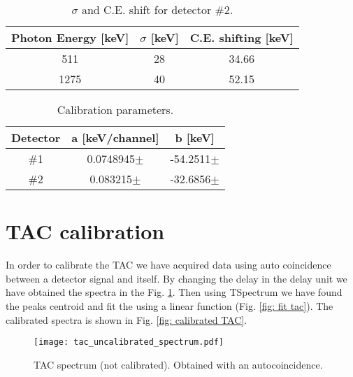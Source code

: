 \begin{table}[h!]
\centering
\begin{tabular}{ccc}
\toprule
\toprule
Photon Energy [keV] & $\sigma$ [keV] & C.E. shifting [keV] \\
\midrule
511 & 28 & 34.66 \\
1275 & 40 & 52.15\\
\bottomrule
\bottomrule
\end{tabular}
\caption{$\sigma$ and C.E. shift for detector \#2.}
\end{table}
\begin{table}[h!]
\centering
\begin{tabular}{ccc}
\toprule
\toprule
Detector & a [keV/channel] & b [keV] \\
\midrule
\#1 &  0.0748945$\pm$ & -54.2511$\pm$ \\
\#2 & 0.083215$\pm$ & -32.6856$\pm$ \\
\bottomrule
\bottomrule
\end{tabular}
\caption{Calibration parameters.}
\end{table}



%
%
\clearpage
\section*{TAC calibration}
In order to calibrate the TAC we have acquired data using auto coincidence between a detector signal and itself. By changing the delay in the delay unit we have obtained the spectra in the Fig. \ref{fig: uncalibrated TAC}. Then using TSpectrum we have found the peaks centroid and fit the using a linear function (Fig. \ref{fig: fit tac}). The calibrated spectra is shown in Fig. \ref{fig: calibrated TAC}.
\begin{figure}[h!]
\centering
\texttt{[image: tac\_uncalibrated\_spectrum.pdf]}
\caption{TAC spectrum (not calibrated). Obtained with an autocoincidence.}
\label{fig: uncalibrated TAC}
\end{figure}


